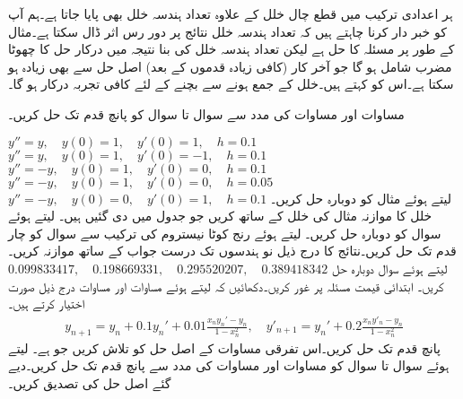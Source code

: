 ہر اعدادی  ترکیب میں قطع چال خلل کے علاوہ  تعداد ہندسہ خلل بھی پایا جاتا ہے۔ہم آپ کو خبر دار کرنا چاہتے ہیں کہ تعداد ہندسہ خلل نتائج پر دور رس اثر ڈال سکتا ہے۔مثال کے طور پر مسئلہ  کا حل  ہے لیکن تعداد ہندسہ خلل کی بنا نتیجہ میں  درکار حل  کا چھوٹا مضرب  شامل ہو گا جو آخر کار (کافی زیادہ قدموں کے بعد) اصل حل سے بھی زیادہ ہو سکتا ہے۔اس کو  کہتے ہیں۔خلل کے جمع ہونے سے بچنے کے لئے کافی تجربہ درکار ہو گا۔


مساوات  اور مساوات  کی مدد سے  سوال  تا سوال  کو پانچ قدم تک حل کریں۔

\quad
$y''=y,\quad y(0)=1,\quad y'(0)=1,\quad h=0.1$
\quad
$y''=y,\quad y(0)=1,\quad y'(0)=-1,\quad h=0.1$
\quad
$y''=-y,\quad y(0)=1,\quad y'(0)=0,\quad h=0.1$
\quad
$y''=-y,\quad y(0)=1,\quad y'(0)=0,\quad h=0.05$
\quad
$y''=-y,\quad y(0)=0,\quad y'(0)=1,\quad h=0.1$
\quad
{} لیتے ہوئے مثال  کو دوبارہ حل کریں۔خلل کا موازنہ مثال  کی خلل کے ساتھ کریں جو جدول  میں دی گئیں ہیں۔ 
\quad
{} لیتے ہوئے سوال  کو دوبارہ حل کریں۔
\quad
{} لیتے ہوئے رنج کوٹا نیستروم کی ترکیب سے سوال  کو چار قدم تک حل کریں۔نتائج کا درج ذیل نو ہندسوں تک درست جواب کے ساتھ موازنہ کریں۔\\
$\num{0.099833417},\quad \num{0.198669331},\quad \num{0.295520207},\quad \num{0.389418342}$
\quad
{} لیتے ہوئے سوال  دوبارہ حل کریں۔
\quad
ابتدائی قیمت مسئلہ  پر غور کریں۔دکھائیں کہ  لیتے ہوئے مساوات  اور مساوات  درج ذیل صورت اختیار کرتے ہیں۔
\begin{align*}
y_{n+1}=y_n+0.1y_n'+0.01\frac{x_ny_n'-y_n}{1-x^2_n},\quad y'_{n+1}=y_n'+0.2\frac{x_ny'_n-y_n}{1-x^2_n}
\end{align*}
پانچ قدم تک حل کریں۔اس تفرقی مساوات کے  اصل حل کو تلاش کریں جو  ہے۔
 لیتے ہوئے سوال  تا سوال  کو مساوات  اور مساوات  کی مدد سے پانچ قدم تک حل کریں۔دیے گئے اصل حل کی تصدیق کریں۔

